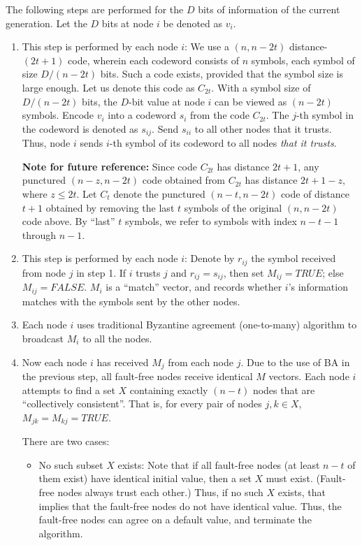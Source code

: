 \documentclass[12pt]{article}
\begin{document}
The following steps are performed for the $D$ bits of information of the current generation.
Let the $D$ bits at node $i$ be denoted as $v_i$.
\begin{enumerate}

\item This step is performed by each node $i$:
We use a $(n,n-2t)$ distance-$(2t+1)$ code, wherein each codeword
consists of $n$ symbols, each symbol of size $D/(n-2t)$ bits.
Such a code exists, provided that the symbol size is large enough.
Let us denote this code as $C_{2t}$.
With a symbol size of $D/(n-2t)$ bits, the $D$-bit value at node $i$
can be viewed as $(n-2t)$ symbols. Encode $v_i$ into a
codeword $s_i$ from the code $C_{2t}$.
The $j$-th symbol in the codeword is denoted as $s_{ij}$.
Send $s_{ii}$ to all other nodes that it trusts.
Thus, node $i$ sends $i$-th symbol of its codeword
to all nodes {\em that it trusts}.

{\bf Note for future reference:}
Since code $C_{2t}$ has distance $2t+1$,
any punctured $(n-z, n-2t)$ code obtained from $C_{2t}$
has distance $2t+1-z$, where $z\leq 2t$. Let $C_t$ denote the
punctured $(n-t, n-2t)$ code of distance $t+1$ obtained by removing the
last $t$ symbols of the original $(n,n-2t)$ code above.
By ``last'' $t$ symbols, we refer to symbols with index $n-t-1$ through $n-1$.

\item This step is performed by each node $i$:
Denote by $r_{ij}$ the symbol received from node $j$ in step 1.
If $i$ trusts $j$ and $r_{ij}=s_{ij}$, then set $M_{ij}=TRUE$; else $M_{ij}=FALSE$.
$M_i$ is a ``match'' vector, and records whether $i$'s information matches
with the symbols sent by the other nodes.

\item Each node $i$ uses traditional Byzantine agreement (one-to-many) algorithm
to broadcast $M_i$ to all the nodes. 

\item Now each node $i$ has received $M_j$ from each node $j$.
Due to the use of BA in the previous step, all fault-free nodes
receive identical $M$ vectors.
Each node $i$ attempts to find a set $X$ containing exactly $(n-t)$ nodes that are
``collectively consistent''. That is, for every pair
of nodes $j,k\in X$, $M_{jk}=M_{kj}=TRUE$.


There are two cases:
\begin{itemize}
\item No such subset $X$ exists: Note that if all fault-free nodes
(at least $n-t$ of them exist) have identical initial value, then a set
$X$ must exist. (Fault-free nodes always trust each other.)
Thus, if no such $X$ exists, that implies that the
fault-free nodes do not have identical value. Thus, the fault-free
nodes can agree on a default value, and terminate the algorithm.


\end{itemize}
\end{enumerate}
\end{document}
